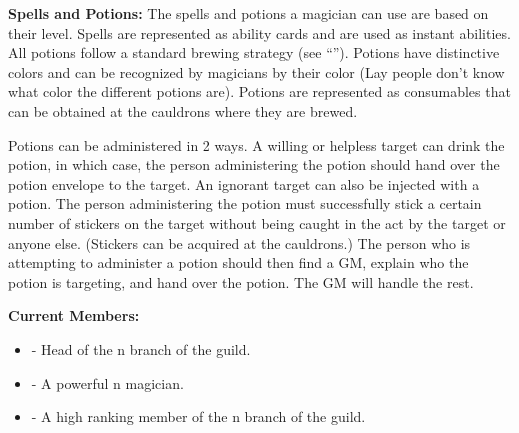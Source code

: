 \documentclass[blue]{NeptuneBall}
\begin{document}
{\bf Spells and Potions:}
The spells and potions a magician can use are based on their level. Spells are represented as ability cards and are used as instant abilities. All potions follow a standard brewing strategy (see ``\gPotions{}''). Potions have distinctive colors and can be recognized by magicians by their color (Lay people don't know what color the different potions are). Potions are represented as consumables that can be obtained at the cauldrons where they are brewed.

Potions can be administered in 2 ways. A willing or helpless target can drink the potion, in which case, the person administering the potion should hand over the potion envelope to the target. An ignorant target can also be injected with a potion. The person administering the potion must successfully stick a certain number of stickers on the target without being caught in the act by the target or anyone else. (Stickers can be acquired at the cauldrons.) The person who is attempting to administer a potion should then find a GM, explain who the potion is targeting, and hand over the potion. The GM will handle the rest.

{\bf Current Members:}
\begin{itemize}
\item \cManta{} - Head of the \pAtlantis{}n branch of the guild.
\item \cWitch{\MYname} - A powerful \pAtlantis{}n magician.
\item \cBodyguard{} - A high ranking member of the \pPacifica{}n branch of the guild.
\end{itemize}
\end{document}
